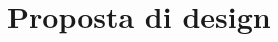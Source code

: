 \documentclass[../Report.tex]{subfiles}
\begin{document}
    \chapter{Proposta di design}
    
\end{document}
